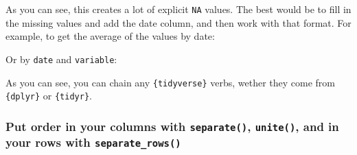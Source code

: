 \documentclass[]{gitbook}
\newenvironment{Shaded}{\begin{snugshade}}{\end{snugshade}}
\newcommand{\DataTypeTok}[1]{\textcolor[rgb]{0.13,0.29,0.53}{#1}}
\newcommand{\DecValTok}[1]{\textcolor[rgb]{0.00,0.00,0.81}{#1}}
\newcommand{\KeywordTok}[1]{\textcolor[rgb]{0.13,0.29,0.53}{\textbf{#1}}}
\newcommand{\NormalTok}[1]{#1}
\newcommand{\OperatorTok}[1]{\textcolor[rgb]{0.81,0.36,0.00}{\textbf{#1}}}
\newcommand{\StringTok}[1]{\textcolor[rgb]{0.31,0.60,0.02}{#1}}
\begin{document}
As you can see, this creates a lot of explicit \texttt{NA} values. The best would be to fill in the missing
values and add the date column, and then work with that format. For example, to get the average
of the values by date:

\begin{Shaded}
\end{Shaded}

Or by \texttt{date} and \texttt{variable}:

\begin{Shaded}
\end{Shaded}

As you can see, you can chain any \texttt{\{tidyverse\}} verbs, wether they come from \texttt{\{dplyr\}} or \texttt{\{tidyr\}}.

\hypertarget{put-order-in-your-columns-with-separate-unite-and-in-your-rows-with-separate_rows}{%
\subsubsection{\texorpdfstring{Put order in your columns with \texttt{separate()}, \texttt{unite()}, and in your rows with \texttt{separate\_rows()}}{Put order in your columns with separate(), unite(), and in your rows with separate\_rows()}}\label{put-order-in-your-columns-with-separate-unite-and-in-your-rows-with-separate_rows}}
\end{document}
